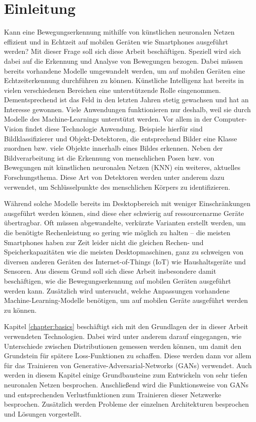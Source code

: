\chapter{Einleitung}
Kann eine Bewegungserkennung mithilfe von künstlichen neuronalen Netzen
effizient und in Echtzeit auf mobilen Geräten wie Smartphones ausgeführt
werden? Mit dieser Frage soll sich diese Arbeit beschäftigen. Speziell wird
sich dabei auf die Erkennung und Analyse von Bewegungen bezogen. Dabei müssen
bereits vorhandene Modelle umgewandelt werden, um auf mobilen Geräten eine
Echtzeiterkennung durchführen zu können. Künstliche Intelligenz hat bereits in
vielen verschiedenen Bereichen eine unterstützende Rolle eingenommen.
Dementsprechend ist das Feld in den letzten Jahren stetig gewachsen und hat an
Interesse gewonnen. Viele Anwendungen funktionieren nur deshalb, weil sie durch
Modelle des Machine-Learnings unterstützt werden. Vor allem in der
Computer-Vision findet diese Technologie Anwendung. Beispiele hierfür sind
Bildklassifizierer und Objekt-Detektoren, die entsprechend Bilder eine Klasse
zuordnen bzw. viele Objekte innerhalb eines Bildes erkennen. Neben der
Bildverarbeitung ist die Erkennung von menschlichen Posen bzw. von Bewegungen
mit künstlichen neuronalen Netzen (KNN) ein weiteres, aktuelles
Forschungsthema. Diese Art von Detektoren werden unter anderem dazu verwendet,
um Schlüs\-sel\-punkte des menschlichen Körpers zu identifizieren.

Während solche Modelle bereits im Desktopbereich mit weniger Einschränkungen
ausgeführt werden können, sind diese eher schwierig auf ressourcenarme Geräte
übertragbar. Oft müssen abgewandelte, verkürzte Varianten erstellt werden, um
die benötigte Rechenleistung so gering wie möglich zu halten -- die meisten
Smartphones haben zur Zeit leider nicht die gleichen Rechen- und
Speicherkapazitäten wie die meisten Desktopmaschinen, ganz zu schweigen von
diversen anderen Geräten des Internet-of-Things (IoT) wie Haushaltsgeräte und
Sensoren. Aus diesem Grund soll sich diese Arbeit insbesondere damit
beschäftigen, wie die Bewegungserkennung auf mobilen Geräten ausgeführt werden
kann. Zusätzlich wird untersucht, welche Anpassungen vorhandene
Machine-Learning-Modelle benötigen, um auf mobilen Geräte ausgeführt werden zu
können.

Kapitel \ref{chapter:basics} beschäftigt sich mit den Grundlagen der in dieser
Arbeit verwendeten Technologien. Dabei wird unter anderem darauf eingegangen,
wie Unterschiede zwischen Distributionen gemessen werden können, um damit den
Grundstein für spätere Loss-Funktionen zu schaffen. Diese werden dann vor allem
für das Trainieren von Generative-Adversarial-Networks (GANs) verwendet. Auch
werden in diesem Kapitel einige Grundbausteine zum Entwickeln von sehr tiefen
neuronalen Netzen besprochen. Anschließend wird die Funktionsweise von GANs und
entsprechenden Verlustfunktionen zum Trainieren dieser Netzwerke besprochen.
Zusätzlich werden Probleme der einzelnen Architekturen besprochen und Lösungen
vorgestellt.

